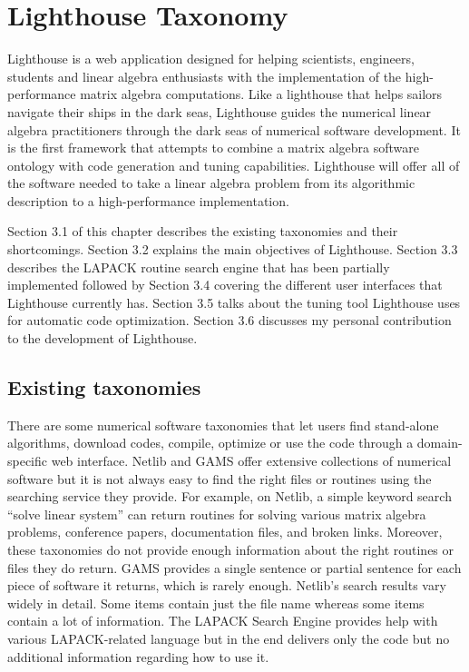 \chapter{Lighthouse Taxonomy}
\label{lighthousechap}

Lighthouse is a web application designed for helping scientists, engineers, students and linear algebra enthusiasts with the implementation of the high-performance matrix algebra computations. Like a lighthouse that helps sailors navigate their ships in the dark seas, Lighthouse guides the numerical linear algebra practitioners through the dark seas of numerical software development. It is the first framework that attempts to combine a matrix algebra software ontology with code generation and tuning capabilities. Lighthouse will offer all of the software needed to take a linear algebra problem from its algorithmic description to a high-performance implementation.

Section 3.1 of this chapter describes the existing taxonomies and their shortcomings. Section 3.2 explains the main objectives of Lighthouse. Section 3.3 describes the LAPACK routine search engine that has been partially implemented followed by Section 3.4 covering the different user interfaces that Lighthouse currently has. Section 3.5 talks about the tuning tool Lighthouse uses for automatic code optimization. Section 3.6 discusses my personal contribution to the development of Lighthouse.

\section{Existing taxonomies}
There are some numerical software taxonomies that let users find stand-alone algorithms, download codes, compile, optimize or use the code through a domain-specific web interface. Netlib \cite{netlib} and GAMS \cite{gams} offer extensive collections of numerical software but it is not always easy to find the right files or routines using the searching service they provide. For example, on Netlib, a simple keyword search ``solve linear system'' can return routines for solving various matrix algebra problems, conference papers, documentation files, and broken links. Moreover, these taxonomies do not provide enough information about the right routines or files they do return. GAMS provides a single sentence or partial sentence for each piece of software it returns, which is rarely enough. Netlib's search results vary widely in detail. Some items contain just the file name whereas some items contain a lot of information. The LAPACK Search Engine \cite{lapacksearch} provides help with various LAPACK-related language but in the end delivers only the code but no additional information regarding how to use it.

